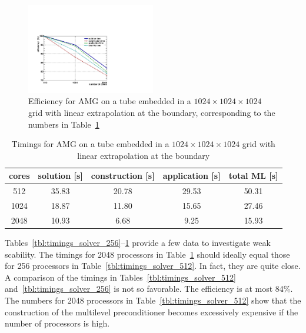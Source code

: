 \begin{figure}[htb] 
  \begin{center}
    \includegraphics[width=0.5\textwidth]{figures/eff_1024_lin.pdf}
    \caption{Efficiency for AMG on a tube embedded in a
      $1024\times1024\times1024$ grid with linear extrapolation at the
      boundary, corresponding to the numbers in
      Table~\ref{tbl:timings_solver_1024}}
    \label{fig:speedup_1024}
  \end{center} 
\end{figure}

\begin{table}[htb]
  \begin{center}
    \begin{tabular}{ccccc}
      \hline
      cores & solution [s] & construction [s] & application [s] & total ML [s] \\
      \hline
      512  &  35.83 &  20.78 &  29.53 &  50.31  \\
      1024 &  18.87 &  11.80 &  15.65 &  27.46  \\
      2048 &  10.93 &  6.68 &  9.25 &  15.93   \\
      \hline
    \end{tabular}
    \caption{Timings for AMG on a tube embedded in a
      $1024\times1024\times1024$ grid with linear extrapolation at the
      boundary}
    \label{tbl:timings_solver_1024}
  \end{center}
\end{table}
Tables~\ref{tbl:timings_solver_256}--\ref{tbl:timings_solver_1024}
provide a few data to investigate weak scability.  The timings for 2048
processors in Table~\ref{tbl:timings_solver_1024} should ideally equal
those for 256 processors in Table~\ref{tbl:timings_solver_512}.  In
fact, they are quite close.  A comparison of the timings in
Tables~\ref{tbl:timings_solver_512} and~\ref{tbl:timings_solver_256} is
not so favorable.  The efficiency is at most 84\%.  The numbers for 2048
processors in Table~\ref{tbl:timings_solver_512} show that the
construction of the multilevel preconditioner becomes excessively
expensive if the number of processors is high.

